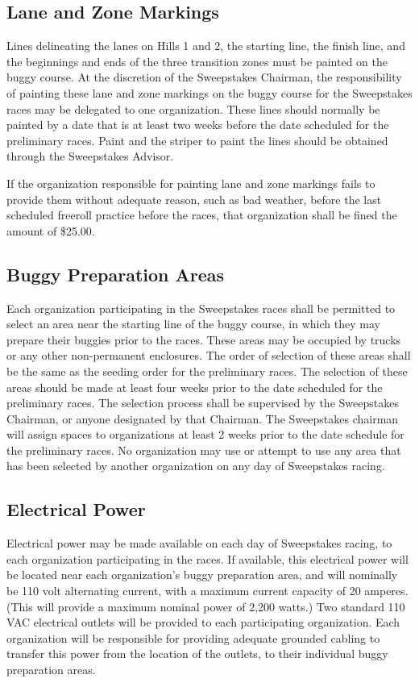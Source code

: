 \subsection{Lane and Zone Markings}

	Lines delineating the lanes on Hills 1 and 2, the starting line, the finish
	line, and the beginnings and ends of the three transition zones must be painted
	on the buggy course. At the discretion of the Sweepstakes Chairman, the
	responsibility of painting these lane and zone markings on the buggy course for
	the Sweepstakes races may be delegated to one organization. These lines should
	normally be painted by a date that is at least two weeks before the date
	scheduled for the preliminary races. Paint and the striper to paint the lines
	should be obtained through the Sweepstakes Advisor.

	If the organization responsible for painting lane and zone markings fails to
	provide them without adequate reason, such as bad weather, before the last
	scheduled freeroll practice before the races, that organization shall be fined
	the amount of \$25.00.

\subsection{Buggy Preparation Areas}

	Each organization participating in the Sweepstakes races shall be permitted to
	select an area near the starting line of the buggy course, in which they may
	prepare their buggies prior to the races. These areas may be occupied by trucks
	or any other non-permanent enclosures. The order of selection of these areas
	shall be the same as the seeding order for the preliminary races. The selection
	of these areas should be made at least four weeks prior to the date scheduled
	for the preliminary races. The selection process shall be supervised by the
	Sweepstakes Chairman, or anyone designated by that Chairman. The Sweepstakes
	chairman will assign spaces to organizations at least 2 weeks prior to the date
	schedule for the preliminary races. No organization may use or attempt to use
	any area that has been selected by another organization on any day of
	Sweepstakes racing.

\subsection{Electrical Power}

	Electrical power may be made available on each day of Sweepstakes racing, to
	each organization participating in the races. If available, this electrical
	power will be located near each organization's buggy preparation area, and will
	nominally be 110 volt alternating current, with a maximum current capacity of
	20 amperes. (This will provide a maximum nominal power of 2,200 watts.) Two
	standard 110 VAC electrical outlets will be provided to each participating
	organization. Each organization will be responsible for providing adequate
	grounded cabling to transfer this power from the location of the outlets, to
	their individual buggy preparation areas.

